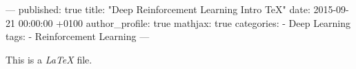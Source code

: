 ---
published: true
title: "Deep Reinforcement Learning Intro TeX"
date:   2015-09-21 00:00:00 +0100
author_profile: true
mathjax: true
categories:
  - Deep Learning
tags:
  - Reinforcement Learning
---

This is a \emph{LaTeX} file.
